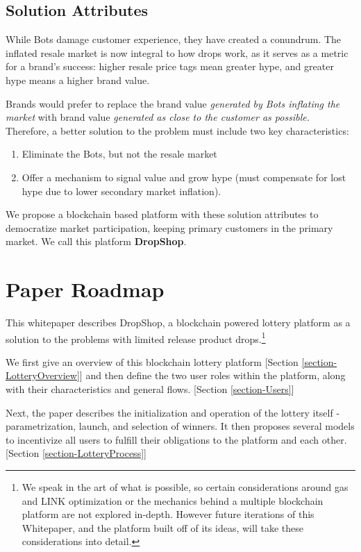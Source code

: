 \documentclass[runningheads]{llncs}
\begin{document}
\subsection{Solution Attributes} 
While Bots damage customer experience, they have created a conundrum.  The inflated resale market is now integral to how drops work, as it serves as a metric for a brand’s success: higher resale price tags mean greater hype, and greater hype means a higher brand value.\cite{5}
	
Brands would prefer to replace the brand value \emph{generated by Bots inflating the market} with brand value \emph{generated as close to the customer as possible.}  Therefore, a better solution to the problem must include two key characteristics:
\begin{enumerate}
\item Eliminate the Bots, but not the resale market
\item Offer a mechanism to signal value and grow hype (must compensate for lost hype due to lower secondary market inflation).
\end{enumerate}

We propose a blockchain based platform with these solution attributes to democratize market participation, keeping primary customers in the primary market.  We call this platform \textbf{DropShop}.

\section{Paper Roadmap}\label{PaperRoadmap}

This whitepaper describes DropShop, a blockchain powered lottery platform as a solution to the problems with limited release product drops.\footnote{We speak in the art of what is possible, so certain considerations around gas and LINK optimization or the mechanics behind a multiple blockchain platform are not explored in-depth.  However future iterations of this Whitepaper, and the platform built off of its ideas, will take these considerations into detail.}   

We first give an overview of this blockchain lottery platform [Section \ref{section-LotteryOverview}] and then define the two user roles within the platform, along with their characteristics and general flows. [Section \ref{section-Users}]

Next, the paper describes the initialization and operation of the lottery itself -  parametrization, launch, and selection of winners.  It then proposes several models to incentivize all users to fulfill their obligations to the platform and each other.   [Section \ref{section-LotteryProcess}]
\end{document}
